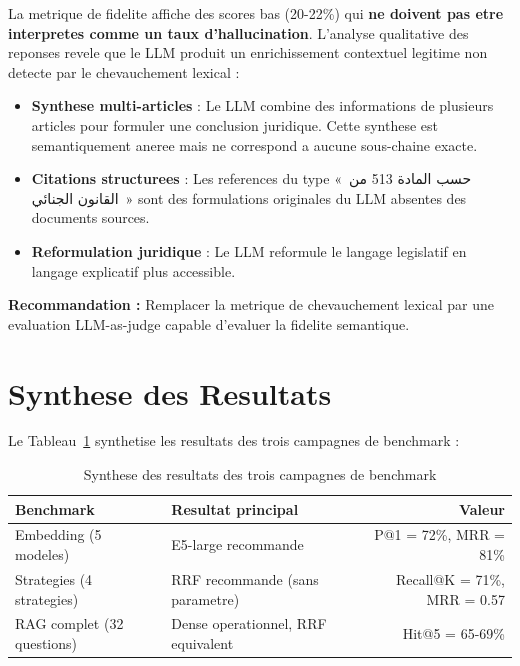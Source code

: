 La metrique de fidelite affiche des scores bas (20-22\%) qui \textbf{ne doivent pas etre interpretes comme un taux d'hallucination}. L'analyse qualitative des reponses revele que le LLM produit un enrichissement contextuel legitime non detecte par le chevauchement lexical :

\begin{itemize}
    \item \textbf{Synthese multi-articles} : Le LLM combine des informations de plusieurs articles pour formuler une conclusion juridique. Cette synthese est semantiquement aneree mais ne correspond a aucune sous-chaine exacte.
    \item \textbf{Citations structurees} : Les references du type \textarabic{«~حسب المادة 513 من القانون الجنائي~»} sont des formulations originales du LLM absentes des documents sources.
    \item \textbf{Reformulation juridique} : Le LLM reformule le langage legislatif en langage explicatif plus accessible.
\end{itemize}

\textbf{Recommandation :} Remplacer la metrique de chevauchement lexical par une evaluation LLM-as-judge capable d'evaluer la fidelite semantique.

\section{Synthese des Resultats}

Le Tableau~\ref{tab:results-synthesis} synthetise les resultats des trois campagnes de benchmark :

\begin{table}[h]
\centering
\renewcommand{\arraystretch}{1.3}
\begin{tabular}{|l|p{5cm}|r|}
\hline
\rowcolor{LightBlue}
\textbf{\color{PrimaryBlue}Benchmark} & \textbf{\color{PrimaryBlue}Resultat principal} & \textbf{\color{PrimaryBlue}Valeur} \\
\hline
Embedding (5 modeles) & E5-large recommande & P@1 = 72\%, MRR = 81\% \\
Strategies (4 strategies) & RRF recommande (sans parametre) & Recall@K = 71\%, MRR = 0.57 \\
RAG complet (32 questions) & Dense operationnel, RRF equivalent & Hit@5 = 65-69\% \\
\hline
\end{tabular}
\caption{Synthese des resultats des trois campagnes de benchmark}
\label{tab:results-synthesis}
\end{table}

